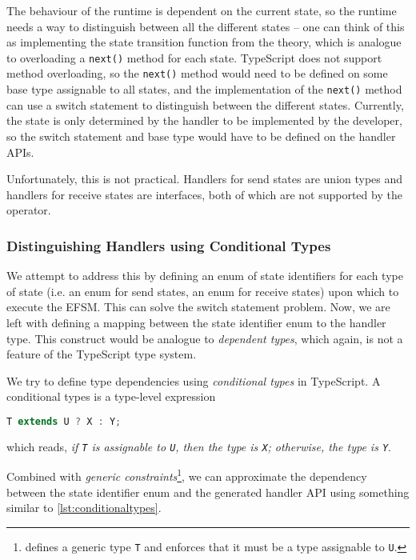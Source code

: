 The behaviour of the runtime is dependent on the current state,
so the runtime needs a way to distinguish between
all the different states -- one can think of this as implementing
the state transition function from the theory, which is analogue to 
overloading a \texttt{next()} method for each state.
TypeScript does not support method overloading,
so the \texttt{next()} method would need to be defined
on some base type assignable to all states,
and the implementation of the \texttt{next()} method 
can use a switch statement to distinguish between the different states.
Currently, the state is only determined by the handler
to be implemented by the developer, so the switch statement
and base type would have to be defined on the handler APIs.

Unfortunately, this is not practical. 
Handlers for send states are union types and
handlers for receive states are interfaces,
both of which are not supported 
by the 
operator.

\subsubsection{Distinguishing Handlers using Conditional Types}
\label{subsubsection:dependenttypes}

We attempt to address this by defining an enum of state identifiers
for each type of state (i.e. an enum for send states, 
an enum for receive states)
upon which to execute the EFSM. 
This can solve the switch statement problem.
Now, we are left with defining a mapping between the 
state identifier enum to the handler type. This construct would be
analogue to \textit{dependent types}, which again, is not a feature
of the TypeScript type system.

We try to define type dependencies using
\textit{conditional types} in TypeScript.
A conditional types is a type-level expression
\begin{lstlisting}[language=javascript,numbers=none]
T extends U ? X : Y;
\end{lstlisting}
which reads, \textit{if \texttt{T} is assignable to \texttt{U},
then the type is \texttt{X}; otherwise, the type is \texttt{Y}}.

Combined with \textit{generic constraints}\footnote{
 defines a generic type \texttt{T}
and enforces that it must be a type assignable to \texttt{U}.
},
we can approximate the dependency between the state identifier
enum and the generated handler API using something
similar to \cref{lst:conditionaltypes}.

